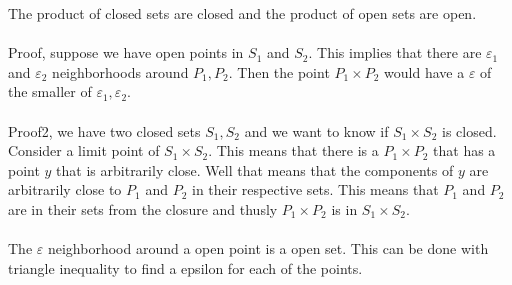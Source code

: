 \documentclass[12pt]{article}
\begin{document}
The product of closed sets are closed and the product of open sets are open. \\\\

Proof, suppose we have open points in $S_1$ and $S_2$. This implies that there are $\varepsilon_1$ and $\varepsilon_2$ neighborhoods around $P_1,P_2$. Then the point $P_1 \times P_2$ would have a $\varepsilon$ of the smaller of $\varepsilon_1, \varepsilon_2$.\\\\

Proof2, we have two closed sets $S_1,S_2$ and we want to know if $S_1 \times S_2$ is closed. 
Consider a limit point of $S_1 \times S_2$. This means that there is a $P_1 \times P_2$ that has a point $y$ that is arbitrarily close. Well that means that the components of $y$ are arbitrarily close to $P_1$ and $P_2$ in their respective sets. This means that $P_1$ and $P_2$ are in their sets from the closure and thusly $P_1 \times P_2$ is in $S_1 \times S_2$. 
\\\\
The $\varepsilon$ neighborhood around a open point is a open set. This can be done with triangle inequality to find a epsilon for each of the points. 

\newpage
\end{document}

